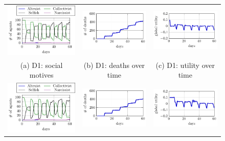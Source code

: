 \begin{figure}[htb]
    \centering
    \begin{tabular}{ccc}
    \includegraphics[width=0.3\linewidth]{008_team_6_agent_design/D/D1_SM.pdf} &   \includegraphics[width=0.3\linewidth]{008_team_6_agent_design/D/D1_deaths.pdf} &
    \includegraphics[width=0.3\linewidth]{008_team_6_agent_design/D/D1_utility.pdf}\\[0pt]
    (a) D1: social motives & (b) D1: deaths over time & (c) D1: utility over time \\[8pt]
         \includegraphics[width=0.3\linewidth]{008_team_6_agent_design/D/D2_SM.pdf} &   \includegraphics[width=0.3\linewidth]{008_team_6_agent_design/D/D2_deaths.pdf} &
    \includegraphics[width=0.3\linewidth]{008_team_6_agent_design/D/D2_utility.pdf}\\[0pt]

\end{tabular}
\end{figure}
